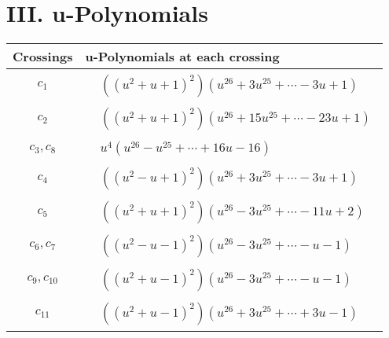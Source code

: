 \documentclass[1p]{elsarticle_modified}
\theoremstyle{definition}
\begin{document}
\newpage\renewcommand{\arraystretch}{1}
\centering \section*{ III. u-Polynomials}
\begin{tabular}{m{50pt}|m{274pt}}
Crossings & \hspace{64pt}u-Polynomials at each crossing \\
\hline $$\begin{aligned}c_{1}\end{aligned}$$&$\begin{aligned}
&((u^2+u+1)^2)(u^{26}+3 u^{25}+\cdots-3 u+1)
\end{aligned}$\\
\hline $$\begin{aligned}c_{2}\end{aligned}$$&$\begin{aligned}
&((u^2+u+1)^2)(u^{26}+15 u^{25}+\cdots-23 u+1)
\end{aligned}$\\
\hline $$\begin{aligned}c_{3},c_{8}\end{aligned}$$&$\begin{aligned}
&u^4(u^{26}- u^{25}+\cdots+16 u-16)
\end{aligned}$\\
\hline $$\begin{aligned}c_{4}\end{aligned}$$&$\begin{aligned}
&((u^2- u+1)^2)(u^{26}+3 u^{25}+\cdots-3 u+1)
\end{aligned}$\\
\hline $$\begin{aligned}c_{5}\end{aligned}$$&$\begin{aligned}
&((u^2+u+1)^2)(u^{26}-3 u^{25}+\cdots-11 u+2)
\end{aligned}$\\
\hline $$\begin{aligned}c_{6},c_{7}\end{aligned}$$&$\begin{aligned}
&((u^2- u-1)^2)(u^{26}-3 u^{25}+\cdots- u-1)
\end{aligned}$\\
\hline $$\begin{aligned}c_{9},c_{10}\end{aligned}$$&$\begin{aligned}
&((u^2+u-1)^2)(u^{26}-3 u^{25}+\cdots- u-1)
\end{aligned}$\\
\hline $$\begin{aligned}c_{11}\end{aligned}$$&$\begin{aligned}
&((u^2+u-1)^2)(u^{26}+3 u^{25}+\cdots+3 u-1)
\end{aligned}$\\
\hline
\end{tabular}\newpage\renewcommand{\arraystretch}{1}
\end{document}
